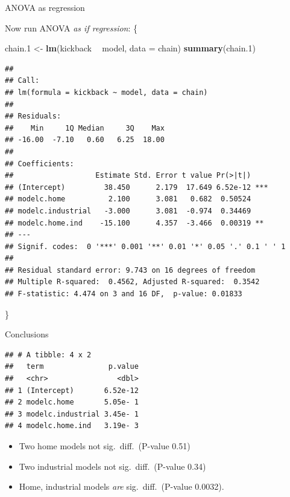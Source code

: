 \documentclass[ignorenonframetext,]{beamer}
\newenvironment{Shaded}{\begin{snugshade}}{\end{snugshade}}
\newcommand{\DataTypeTok}[1]{\textcolor[rgb]{0.13,0.29,0.53}{#1}}
\newcommand{\FloatTok}[1]{\textcolor[rgb]{0.00,0.00,0.81}{#1}}
\newcommand{\KeywordTok}[1]{\textcolor[rgb]{0.13,0.29,0.53}{\textbf{#1}}}
\newcommand{\NormalTok}[1]{#1}
\newcommand{\OperatorTok}[1]{\textcolor[rgb]{0.81,0.36,0.00}{\textbf{#1}}}
\newcommand{\StringTok}[1]{\textcolor[rgb]{0.31,0.60,0.02}{#1}}
\begin{document}
\begin{frame}[fragile]{ANOVA as regression}
\protect\hypertarget{anova-as-regression}{}

Now run ANOVA \emph{as if regression}: \{\scriptsize

\begin{Shaded}
\begin{Highlighting}[]
\NormalTok{chain}\FloatTok{.1}\NormalTok{ <-}\StringTok{ }\KeywordTok{lm}\NormalTok{(kickback }\OperatorTok{~}\StringTok{ }\NormalTok{model, }\DataTypeTok{data =}\NormalTok{ chain)}
\KeywordTok{summary}\NormalTok{(chain}\FloatTok{.1}\NormalTok{)}
\end{Highlighting}
\end{Shaded}

\begin{verbatim}
## 
## Call:
## lm(formula = kickback ~ model, data = chain)
## 
## Residuals:
##    Min     1Q Median     3Q    Max 
## -16.00  -7.10   0.60   6.25  18.00 
## 
## Coefficients:
##                   Estimate Std. Error t value Pr(>|t|)    
## (Intercept)         38.450      2.179  17.649 6.52e-12 ***
## modelc.home          2.100      3.081   0.682  0.50524    
## modelc.industrial   -3.000      3.081  -0.974  0.34469    
## modelc.home.ind    -15.100      4.357  -3.466  0.00319 ** 
## ---
## Signif. codes:  0 '***' 0.001 '**' 0.01 '*' 0.05 '.' 0.1 ' ' 1
## 
## Residual standard error: 9.743 on 16 degrees of freedom
## Multiple R-squared:  0.4562, Adjusted R-squared:  0.3542 
## F-statistic: 4.474 on 3 and 16 DF,  p-value: 0.01833
\end{verbatim}

\}

\end{frame}

\begin{frame}[fragile]{Conclusions}
\protect\hypertarget{conclusions-2}{}

\begin{Shaded}
\end{Shaded}

\begin{verbatim}
## # A tibble: 4 x 2
##   term               p.value
##   <chr>                <dbl>
## 1 (Intercept)       6.52e-12
## 2 modelc.home       5.05e- 1
## 3 modelc.industrial 3.45e- 1
## 4 modelc.home.ind   3.19e- 3
\end{verbatim}

\begin{itemize}
\item
  Two home models not sig.~diff.~(P-value 0.51)
\item
  Two industrial models not sig.~diff.~(P-value 0.34)
\item
  Home, industrial models \emph{are} sig.~diff.~(P-value 0.0032).
\end{itemize}

\end{frame}
\end{document}
